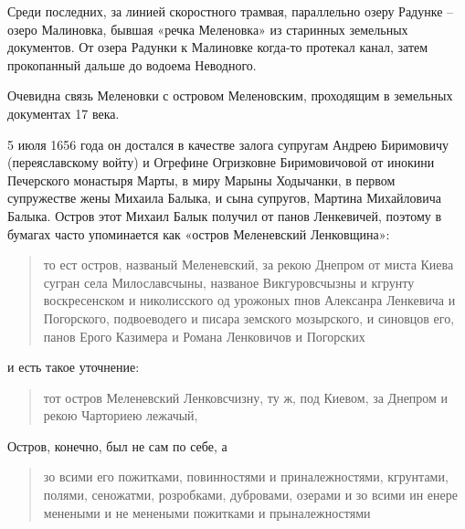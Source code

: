 Среди последних, за линией скоростного трамвая, параллельно озеру Радунке – озеро Малиновка, бывшая «речка Меленовка» из старинных земельных документов. От озера Радунки к Малиновке когда-то протекал канал, затем прокопанный дальше до водоема Неводного.



Очевидна связь Меленовки с островом Меленовским, проходящим в земельных документах 17 века.

5 июля 1656 года он достался в качестве залога супругам Андрею Биримовичу (переяславскому войту) и Огрефине Огризковне Биримовичовой от инокини Печерского монастыря Марты, в миру Марыны Ходычанки, в первом супружестве жены Михаила Балыка, и сына супругов, Мартина Михайловича Балыка. Остров этот Михаил Балык получил от панов Ленкевичей, поэтому в бумагах часто упоминается как «остров Меленевский Ленковщина»\cite{mihdocs}:

\begin{quotation}
то ест остров, названый Меленевский, за рекою Днепром от миста Киева сугран села Милославсчыны, названое Викгуровсчызны и кгрунту воскресенском и николисского од урожоных пнов Алексанра Ленкевича и Погорского, подвоеводего и писара земского мозырского, и синовцов его, панов Ерого Казимера и Романа Ленковичов и Погорских
\end{quotation}

и есть такое уточнение:

\begin{quotation}
тот остров Меленевский Ленковсчизну, ту ж, под Киевом, за Днепром и рекою Чарториею лежачый,
\end{quotation}

Остров, конечно, был не сам по себе, а

\begin{quotation}
зо всими его пожитками, повинностями и приналежностями, кгрунтами, полями, сеножатми, розробками, дубровами, озерами и зо всими ин енере менеными и не менеными пожитками и прыналежностями
\end{quotation}

